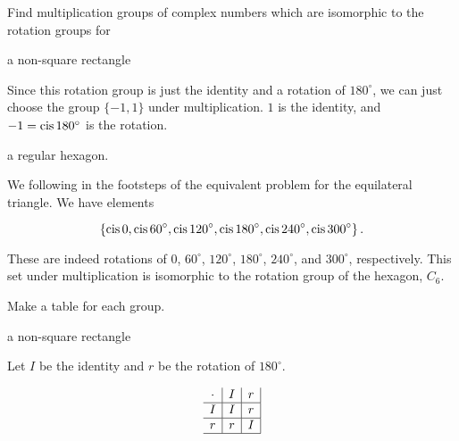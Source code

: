 \documentclass[../key.tex]{subfiles}
\begin{document}
\begin{outer_problem}
\item
\end{outer_problem}

\begin{inner_problem}[start=1]
\item Find multiplication groups of complex numbers which are isomorphic to the rotation groups for
\end{inner_problem}

\begin{iinner_problem}[start=1]
\item a non-square rectangle
\end{iinner_problem}

Since this rotation group is just the identity and a rotation of $180^\circ$, we can just choose the group $\{-1,1\}$ under multiplication. $1$ is the identity, and $-1=\operatorname{cis} 180^\circ$ is the rotation.

\begin{iinner_problem}
\item a regular hexagon.
\end{iinner_problem}

We following in the footsteps of the equivalent problem for the equilateral triangle. We have elements

$$\left\{\operatorname{cis} 0, \operatorname{cis} 60^\circ, \operatorname{cis} 120^\circ, \operatorname{cis} 180^\circ, \operatorname{cis} 240^\circ, \operatorname{cis} 300^\circ \right\}.$$

These are indeed rotations of $0$, $60^\circ$, $120^\circ$, $180^\circ$, $240^\circ$, and $300^\circ$, respectively. This set under multiplication is isomorphic to the rotation group of the hexagon, $C_6$.

\begin{inner_problem}
\item Make a table for each group.
\end{inner_problem}

\begin{iinner_problem}[start=1]
\item a non-square rectangle
\end{iinner_problem}

Let $I$ be the identity and $r$ be the rotation of $180^\circ$.

$$\begin{array}{c|c|c|}
\cdot & I & r \\ \hline
I & I & r \\ \hline
r & r & I \\ \hline
\end{array}$$
\end{document}
